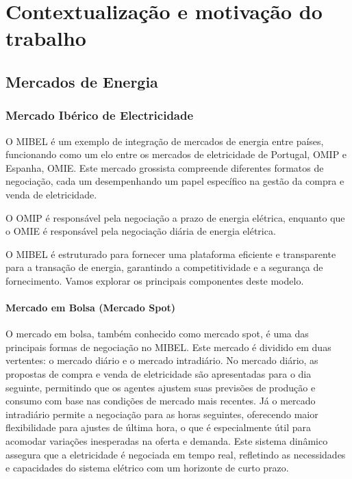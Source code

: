 \section{Contextualização e motivação do trabalho\label{ch:contextos}}

\subsection{Mercados de Energia}

\subsubsection{Mercado Ibérico de Electricidade \label{se:mibel}}

O \gls{MIBEL} é um exemplo de integração de mercados de energia entre países, funcionando como um elo entre os mercados de eletricidade de Portugal, \gls{OMIP} e Espanha, \gls{OMIE}. Este mercado grossista compreende diferentes formatos de negociação, cada um desempenhando um papel específico na gestão da compra e venda de eletricidade.\par
O \gls{OMIP} é responsável pela negociação a prazo de energia elétrica, enquanto que o  \gls{OMIE} é responsável pela negociação diária de energia elétrica.\par
O \gls{MIBEL} é estruturado para fornecer uma plataforma eficiente e transparente para a transação de energia, garantindo a competitividade e a segurança de fornecimento. Vamos explorar os principais componentes deste modelo.\par


\paragraph{Mercado em Bolsa (Mercado Spot) \label{se:mercado_bolsa}}
\text{ }  \par
O mercado em bolsa, também conhecido como mercado spot, é uma das principais formas de negociação no \gls{MIBEL}. Este mercado é dividido em duas vertentes: o mercado diário e o mercado intradiário. No mercado diário, as propostas de compra e venda de eletricidade são apresentadas para o dia seguinte, permitindo que os agentes ajustem suas previsões de produção e consumo com base nas condições de mercado mais recentes. Já o mercado intradiário permite a negociação para as horas seguintes, oferecendo maior flexibilidade para ajustes de última hora, o que é especialmente útil para acomodar variações inesperadas na oferta e demanda. Este sistema dinâmico assegura que a eletricidade é negociada em tempo real, refletindo as necessidades e capacidades do sistema elétrico com um horizonte de curto prazo.\par


